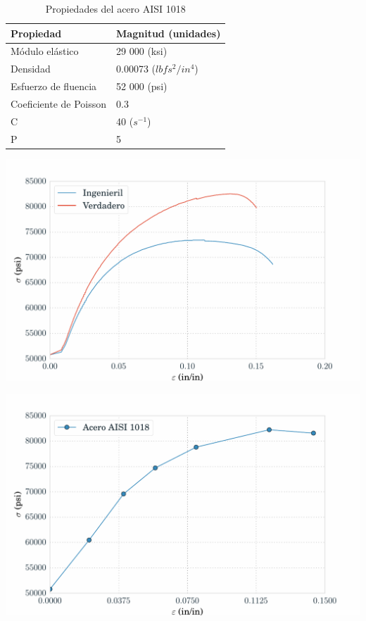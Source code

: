 
\begin{table}[h]
\centering
\caption{Propiedades del acero AISI 1018}
\label{}
\begin{tabular}{p{4cm} p{4cm}} \hline
Propiedad & Magnitud (unidades) \\
\hline
Módulo elástico & 29 000 (ksi) \\
Densidad & 0.00073 ($lbf s^2/in^4$) \\
Esfuerzo de fluencia & 52 000 (psi) \\
Coeficiente de Poisson & 0.3 \\
C & 40 ($s^{-1}$) \\
P & 5 \\
\hline
\end{tabular}
\label{tab:material_properties}
\end{table}


\begin{center}
\includegraphics[scale=0.75]{src/ch3/material_curve.pdf}
\label{fig:material_curve}
\end{center}


\begin{center}
\includegraphics[scale=0.75]{src/ch3/ls_dyna_material_curve.pdf}
\label{fig:ls_dyna_material_curve}
\end{center}


